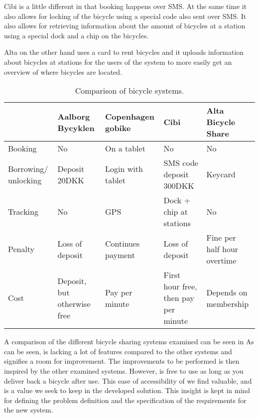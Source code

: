 Cibi is a little different in that booking happens over SMS.
At the same time it also allows for locking of the bicycle using a special code also sent over SMS.
It also allows for retrieving information about the amount of bicycles at a station using a special dock and a chip on the bicycles.

Alta on the other hand uses a card to rent bicycles and it uploads information about bicycles at stations for the users of the system to more easily get an overview of where bicycles are located.

\begin{table}[h]
	\begin{tabular}{|p{}|p{}|p{}|p{}|p{}|}
		\hline                      & Aalborg Bycyklen              & Copenhagen gobike & Cibi                     & Alta Bicycle Share \\ 
		\hline Booking              & No                            & On a tablet       & No                       & No \\ 
		\hline Borrowing/ unlocking & Deposit 20DKK                 & Login with tablet & SMS code deposit 300DKK  & Keycard \\ 
		\hline Tracking             & No                            & GPS               & Dock + chip at stations  & No \\ 
		\hline Penalty              & Loss of deposit               & Continues payment & Loss of deposit          & Fine per half hour overtime \\ 
		\hline Cost                 & Deposit, but otherwise free   & Pay per minute    & First hour free, then pay per minute  & Depends on membership \\ 
		\hline 
	\end{tabular} 
	\caption{Comparison of bicycle systems.}
	\label{tab:bicyclecompare}
\end{table}

A comparison of the different bicycle sharing systems examined can be seen in 
As can be seen, \bycykel is lacking a lot of features compared to the other systems and signifies a room for improvement.
The improvements to be performed is then inspired by the other examined systems.
However, \bycykel is free to use as long as you deliver back a bicycle after use. 
This ease of accessibility of \bycykel we find valuable, and is a value we seek to keep in the developed solution.
This insight is kept in mind for defining the problem definition and the specification of the requirements for the new system.